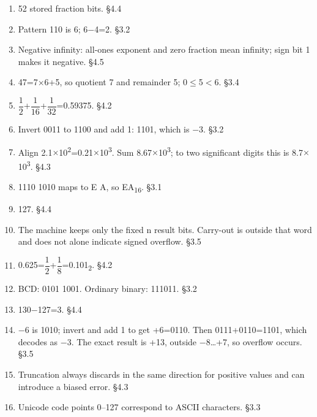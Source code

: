 \documentclass[11pt]{article}
\begin{document}
\begin{keepsection}
\begin{enumerate}
\item 52 stored fraction bits. \hfill{\small\color{FAUblue}§4.4}
\item Pattern 110 is 6; 6\ensuremath{-}4=2. \hfill{\small\color{FAUblue}§3.2}
\item Negative infinity: all-ones exponent and zero fraction mean infinity; sign bit 1 makes it negative. \hfill{\small\color{FAUblue}§4.5}
\item 47=7\ensuremath{\times}6+5, so quotient 7 and remainder 5; 0\ensuremath{\leq}5\ensuremath{<}6. \hfill{\small\color{FAUblue}§3.4}
\item {\small\ensuremath{\dfrac{1}{2}}}+{\small\ensuremath{\dfrac{1}{16}}}+{\small\ensuremath{\dfrac{1}{32}}}=0.59375. \hfill{\small\color{FAUblue}§4.2}
\item Invert 0011 to 1100 and add 1: 1101, which is \ensuremath{-}3. \hfill{\small\color{FAUblue}§3.2}
\item Align 2.1\ensuremath{\times}10\textsuperscript{2}=0.21\ensuremath{\times}10\textsuperscript{3}. Sum 8.67\ensuremath{\times}10\textsuperscript{3}; to two significant digits this is 8.7\ensuremath{\times}10\textsuperscript{3}. \hfill{\small\color{FAUblue}§4.3}
\item 1110 1010 maps to E A, so EA\textsubscript{16}. \hfill{\small\color{FAUblue}§3.1}
\item 127. \hfill{\small\color{FAUblue}§4.4}
\item The machine keeps only the fixed n result bits. Carry-out is outside that word and does not alone indicate signed overflow. \hfill{\small\color{FAUblue}§3.5}
\item 0.625={\small\ensuremath{\dfrac{1}{2}}}+{\small\ensuremath{\dfrac{1}{8}}}=0.101\textsubscript{2}. \hfill{\small\color{FAUblue}§4.2}
\item BCD: 0101 1001. Ordinary binary: 111011. \hfill{\small\color{FAUblue}§3.2}
\item 130\ensuremath{-}127=3. \hfill{\small\color{FAUblue}§4.4}
\item \ensuremath{-}6 is 1010; invert and add 1 to get +6=0110. Then 0111+0110=1101, which decodes as \ensuremath{-}3. The exact result is +13, outside \ensuremath{-}8…+7, so overflow occurs. \hfill{\small\color{FAUblue}§3.5}
\item Truncation always discards in the same direction for positive values and can introduce a biased error. \hfill{\small\color{FAUblue}§4.3}
\item Unicode code points 0–127 correspond to ASCII characters. \hfill{\small\color{FAUblue}§3.3}

\end{enumerate}
\end{keepsection}
\end{document}
